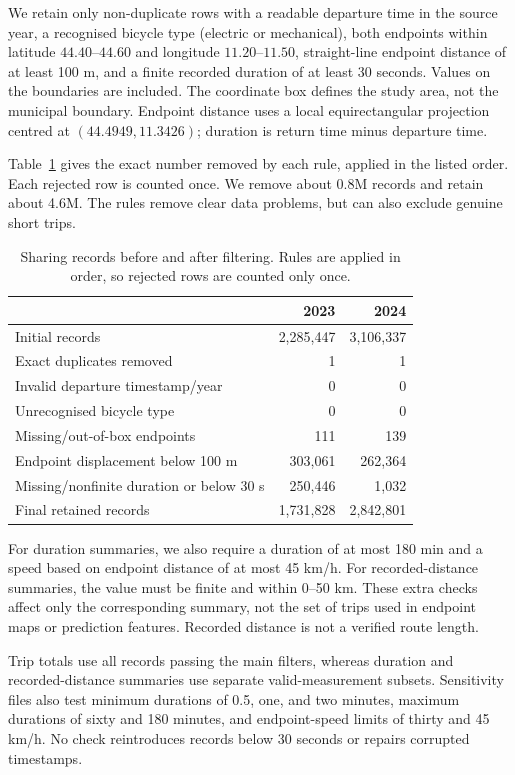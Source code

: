 \documentclass{interact}
\begin{document}
We retain only non-duplicate rows with a readable departure time in the source year, a recognised bicycle type (electric or mechanical), both endpoints within latitude $44.40$--$44.60$ and longitude $11.20$--$11.50$, straight-line endpoint distance of at least 100 m, and a finite recorded duration of at least 30 seconds. Values on the boundaries are included. The coordinate box defines the study area, not the municipal boundary. Endpoint distance uses a local equirectangular projection centred at $(44.4949,11.3426)$; duration is return time minus departure time.

Table~\ref{tab:audit} gives the exact number removed by each rule, applied in the listed order. Each rejected row is counted once. We remove about 0.8M records and retain about 4.6M. The rules remove clear data problems, but can also exclude genuine short trips.

\begin{table}[t]
\caption{Sharing records before and after filtering. Rules are applied in order, so rejected rows are counted only once.}
\label{tab:audit}\centering\footnotesize
\begin{tabular}{lrr}
\toprule
 & 2023 & 2024 \\
\midrule
Initial records & 2,285,447 & 3,106,337 \\
\midrule
Exact duplicates removed & 1 & 1 \\
Invalid departure timestamp/year & 0 & 0 \\
Unrecognised bicycle type & 0 & 0 \\
Missing/out-of-box endpoints & 111 & 139 \\
Endpoint displacement below 100 m & 303,061 & 262,364 \\
Missing/nonfinite duration or below 30 s & 250,446 & 1,032 \\
\midrule
Final retained records & 1,731,828 & 2,842,801 \\
\bottomrule
\end{tabular}
\end{table}

For duration summaries, we also require a duration of at most 180 min and a speed based on endpoint distance of at most 45 km/h. For recorded-distance summaries, the value must be finite and within 0--50 km. These extra checks affect only the corresponding summary, not the set of trips used in endpoint maps or prediction features. Recorded distance is not a verified route length.

Trip totals use all records passing the main filters, whereas duration and recorded-distance summaries use separate valid-measurement subsets. Sensitivity files also test minimum durations of 0.5, one, and two minutes, maximum durations of sixty and 180 minutes, and endpoint-speed limits of thirty and 45 km/h. No check reintroduces records below 30 seconds or repairs corrupted timestamps.
\end{document}
